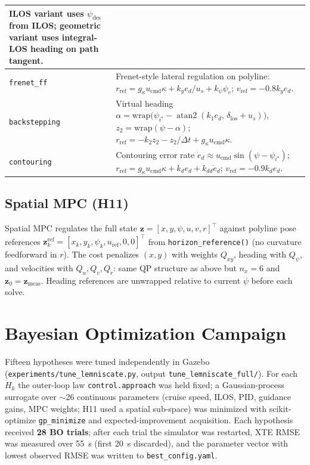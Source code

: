 \documentclass[11pt,a4paper]{article}
\begin{document}
\begin{table}[H]
\begin{tabular}{@{}p{2.1cm}p{10.8cm}@{}}
      ILOS variant uses $\psi_{\mathrm{des}}$ from ILOS; geometric variant uses integral-LOS
      heading on path tangent. \\
    \midrule
    \texttt{frenet\_ff}
    & Frenet-style lateral regulation on polyline:
      $r_{\mathrm{ref}} = g_\kappa u_{\mathrm{cmd}}\kappa
      + k_y e_d/u_s + k_\psi \psi_e$;
      $v_{\mathrm{ref}} = -0.8 k_y e_d$. \\
    \midrule
    \texttt{backstepping}
    & Virtual heading
      $\alpha = \mathrm{wrap}\!\bigl(\psi_{i^\star}
      - \operatorname{atan2}(k_1 e_d,\, \delta_{\mathrm{los}}+u_s)\bigr)$,
      $z_2 = \mathrm{wrap}(\psi-\alpha)$;
      $r_{\mathrm{ref}} = -k_2 z_2 - z_2/\Delta t + g_\kappa u_{\mathrm{cmd}}\kappa$. \\
    \midrule
    \texttt{contouring}
    & Contouring error rate $\dot e_d \approx u_{\mathrm{cmd}}\sin(\psi-\psi_{i^\star})$;
      $r_{\mathrm{ref}} = g_\kappa u_{\mathrm{cmd}}\kappa
      + k_d e_d + k_{dd}\dot e_d$;
      $v_{\mathrm{ref}} = -0.9 k_d e_d$. \\
    \bottomrule
  \end{tabular}
\end{table}

\subsection{Spatial MPC (H11)}

Spatial MPC regulates the full state
$\mathbf{z}=[x,y,\psi,u,v,r]^\top$ against polyline pose references
$\mathbf{z}^{\mathrm{ref}}_k = [x_k,y_k,\psi_k,u_{\mathrm{ref}},0,0]^\top$ from
\texttt{horizon\_reference()} (no curvature feedforward in $r$). The cost penalizes
$(x,y)$ with weights $Q_{xy}$, heading with $Q_\psi$, and velocities with $Q_u,Q_v,Q_r$:
same QP structure as above but $n_x=6$ and $\mathbf{z}_0=\mathbf{z}_{\mathrm{meas}}$.
Heading references are unwrapped relative to current $\psi$ before each solve.

\section{Bayesian Optimization Campaign}
\label{sec:bo}

Fifteen hypotheses were tuned independently in Gazebo
(\texttt{experiments/tune\_lemniscate.py}, output \texttt{tune\_lemniscate\_full/}).
For each $H_k$ the outer-loop law \texttt{control.approach} was held fixed; a Gaussian-process
surrogate over $\sim$26 continuous parameters (cruise speed, ILOS, PID, guidance gains, MPC
weights; H11 used a spatial sub-space) was minimized with scikit-optimize
\texttt{gp\_minimize} and expected-improvement acquisition. Each hypothesis received
\textbf{28 BO trials}; after each trial the simulator was restarted, XTE RMSE was measured over
\SI{55}{\second} (first \SI{20}{\second} discarded), and the parameter vector with lowest
observed RMSE was written to \texttt{best\_config.yaml}.
\end{document}
